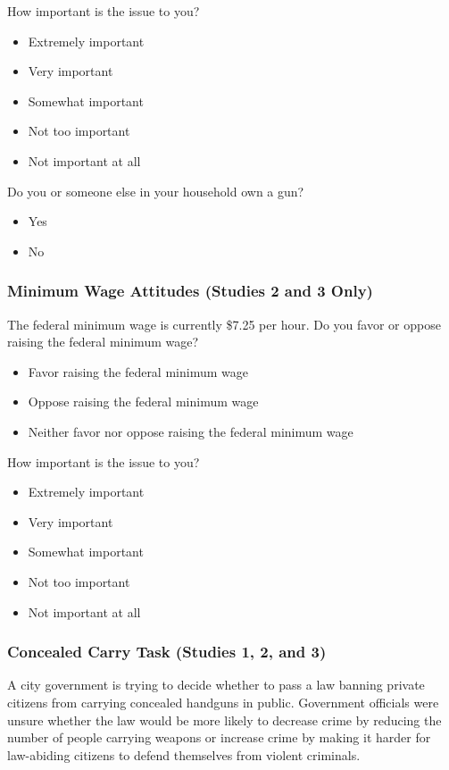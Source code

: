 \documentclass[12pt, letterpaper]{article}
\begin{document}
How important is the issue to you?
\vspace{-3mm}
\begin{itemize}
\setlength\itemsep{-.5em}
  \item Extremely important
  \item Very important
  \item Somewhat important
  \item Not too important
  \item Not important at all
\end{itemize}

Do you or someone else in your household own a gun?
\vspace{-3mm}
\begin{itemize}
\setlength\itemsep{-.5em}
  \item Yes
  \item No
\end{itemize}

\subsubsection{Minimum Wage Attitudes (Studies 2 and 3 Only)}
The federal minimum wage is currently \$7.25 per hour. Do you favor or oppose raising the federal minimum wage?
\vspace{-3mm}
\begin{itemize}
\setlength\itemsep{-.5em}
  \item Favor raising the federal minimum wage
  \item Oppose raising the federal minimum wage
  \item Neither favor nor oppose raising the federal minimum wage
\end{itemize}

How important is the issue to you?
\vspace{-3mm}
\begin{itemize}
\setlength\itemsep{-.5em}
  \item Extremely important
  \item Very important
  \item Somewhat important
  \item Not too important
  \item Not important at all
\end{itemize}


\subsubsection{Concealed Carry Task (Studies 1, 2, and 3)}
A city government is trying to decide whether to pass a law banning private citizens from carrying concealed handguns in public. Government officials were unsure whether the law would be more likely to decrease crime by reducing the number of people carrying weapons or increase crime by making it harder for law-abiding citizens to defend themselves from violent criminals.
\end{document}
